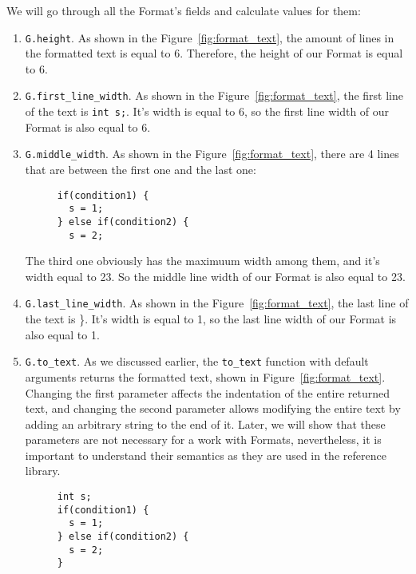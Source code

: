 \documentclass[14pt]{constructor-diploma}
\begin{document}
We will go through all the Format's fields and calculate values for them:

\begin{enumerate}
  \item \texttt{G.height}. As shown in the Figure~\ref{fig:format_text}, the amount of lines in 
  the formatted text is equal to 6. Therefore, the height of our Format is equal to 6.
  \item \texttt{G.first\_line\_width}. As shown in the Figure~\ref{fig:format_text}, 
  the first line of the text is \texttt{int s;}. It's width is equal to 6, so 
  the first line width of our Format is also equal to 6.
  \item \texttt{G.middle\_width}. As shown in the Figure~\ref{fig:format_text}, there are 4
  lines that are between the first one and the last one:
\begin{figure}[H]
\begin{verbatim}
if(condition1) { 
  s = 1; 
} else if(condition2) { 
  s = 2; 
\end{verbatim}
\end{figure}
\vspace*{-25pt}
  The third one obviously has the maximuum width among them, and it's width equal to 23. So the middle line width 
  of our Format is also equal to 23.
  \item \texttt{G.last\_line\_width}. As shown in the Figure~\ref{fig:format_text}, the last line of the 
  text is \}. It's width is equal to 1, so the last line width of our Format is also equal to 1.
  \item \texttt{G.to\_text}. As we discussed earlier, the \texttt{to\_text} function with default arguments returns the formatted text, shown 
  in Figure~\ref{fig:format_text}. 
  Changing the first parameter affects the indentation of the entire returned text, and changing the second parameter allows modifying the entire text by adding an arbitrary string to the end of it. 
  Later, we will show that these parameters are not necessary for a work with Formats, nevertheless, it is important to understand their semantics as they are used in the reference library.

\begin{figure}[H]
\begin{minipage}{0.5\textwidth}

\begin{mdframed}[backgroundcolor=bg]
\begin{verbatim}
int s;
if(condition1) { 
  s = 1; 
} else if(condition2) { 
  s = 2; 
}
\end{verbatim}
\end{mdframed}
\end{minipage}
\begin{minipage}{0.5\textwidth}


\end{minipage}
\end{figure}
\end{enumerate}
\end{document}
